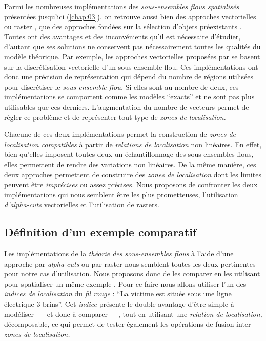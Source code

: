 Parmi les nombreuses implémentations des \emph{sous-ensembles flous
  spatialisés} présentées jusqu'ici (\autoref{chap:03}), on retrouve
aussi bien des approches vectorielles
\autocite{Kanjilal2010,Dilo2007,Zoghlami2016} ou raster
\autocite{Bloch1996}, que des approches fondées sur la sélection
d'objets préexistants \autocite{Duraciova2017}. Toutes ont des
avantages et des inconvénients qu'il est nécessaire d'étudier,
d'autant que ses solutions ne conservent pas nécessairement toutes les
qualités du modèle théorique. Par exemple, les approches vectorielles
proposées par \textcite{Kanjilal2010,Zoghlami2016} se basent sur la
discrétisation vectorielle d'un sous-ensemble flou. Ces
implémentations ont donc une précision de représentation qui dépend du
nombre de régions utilisées pour discrétiser le \emph{sous-ensemble
  flou.} Si elles sont au nombre de deux, ces implémentations se
comportent comme les modèles \enquote{exacts} et ne sont pas plus
utilisables que ces derniers. L'augmentation du nombre de vecteurs
permet de régler ce problème et de représenter tout type de
\emph{zones de localisation.}


Chacune de ces deux implémentations permet la construction de
\emph{zones de localisation compatibles} à partir de \emph{relations
  de localisation} non linéaires. En effet, bien qu'elles imposent
toutes deux un échantillonnage des sous-ensembles flous, elles
permettent de rendre des variations non linéaires. De la même manière,
ces deux approches permettent de construire des \emph{zones de
  localisation} dont les limites peuvent être \emph{imprécises} ou
assez précises. Nous proposons de confronter les deux implémentations
qui nous semblent être les plus prometteuses, l'utilisation
\emph{d'alpha-cuts} vectorielles et l'utilisation de rasters.

\subsection{Définition d'un exemple comparatif}

Les implémentations de la \emph{théorie des sous-ensembles flous} à
l'aide d'une approche par \emph{alpha-cuts} ou par raster nous
semblent toutes les deux pertinentes pour notre cas
d'utilisation. Nous proposons donc de les comparer en les utilisant
pour spatialiser un même exemple \autocite{Bunel2019a}. Pour ce faire
nous allons utiliser l'un des \emph{indices de localisation} du
\emph{fil rouge} : \enquote{La victime est située sous une ligne
  électrique 3 brins}. Cet \emph{indice} présente le double avantage
d'être simple à modéliser ---~et donc à comparer~---, tout en
utilisant une \emph{relation de localisation,} décomposable, ce qui
permet de tester également les opérations de fusion inter \emph{zones
  de localisation.}

